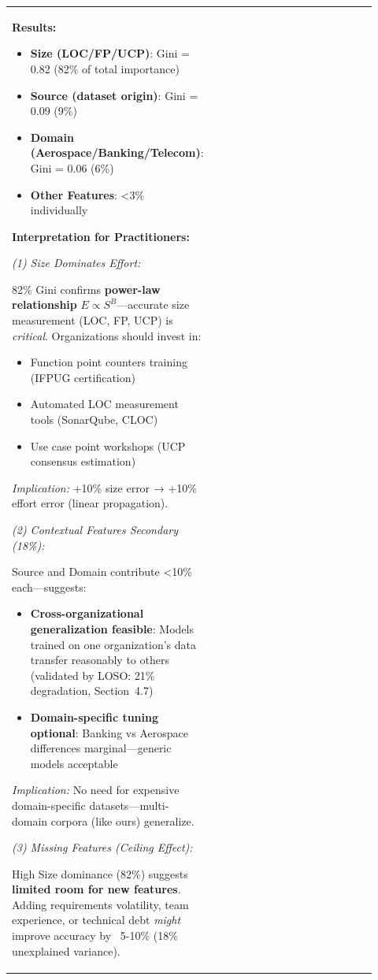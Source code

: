 \documentclass[11pt,a4paper]{article}
\begin{document}
\begin{longtable}{>{\raggedright\arraybackslash}p{0.26\linewidth}|>{\raggedright\arraybackslash}p{0.44\linewidth}|>{\raggedright\arraybackslash}p{0.22\linewidth}}
\textbf{Results:}

\begin{itemize}
    \item \textbf{Size (LOC/FP/UCP)}: Gini = 0.82 (82\% of total importance)
    \item \textbf{Source (dataset origin)}: Gini = 0.09 (9\%)
    \item \textbf{Domain (Aerospace/Banking/Telecom)}: Gini = 0.06 (6\%)
    \item \textbf{Other Features}: <3\% individually
\end{itemize}

\textbf{Interpretation for Practitioners:}

\textit{(1) Size Dominates Effort:}

82\% Gini confirms \textbf{power-law relationship} $E \propto S^B$---accurate size measurement (LOC, FP, UCP) is \textit{critical}. Organizations should invest in:
\begin{itemize}
    \item Function point counters training (IFPUG certification)
    \item Automated LOC measurement tools (SonarQube, CLOC)
    \item Use case point workshops (UCP consensus estimation)
\end{itemize}

\textit{Implication:} +10\% size error → +10\% effort error (linear propagation).

\textit{(2) Contextual Features Secondary (18\%):}

Source and Domain contribute <10\% each---suggests:
\begin{itemize}
    \item \textbf{Cross-organizational generalization feasible}: Models trained on one organization's data transfer reasonably to others (validated by LOSO: 21\% degradation, Section~4.7)
    \item \textbf{Domain-specific tuning optional}: Banking vs Aerospace differences marginal---generic models acceptable
\end{itemize}

\textit{Implication:} No need for expensive domain-specific datasets---multi-domain corpora (like ours) generalize.

\textit{(3) Missing Features (Ceiling Effect):}

High Size dominance (82\%) suggests \textbf{limited room for new features}. Adding requirements volatility, team experience, or technical debt \textit{might} improve accuracy by ~5-10\% (18\% unexplained variance).


\end{longtable}
\end{document}
